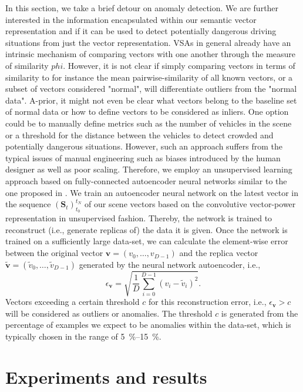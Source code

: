 In this section, we take a brief detour on anomaly detection.
We are further interested in the information encapsulated within our semantic vector representation and if it can be used to detect potentially dangerous driving situations from just the vector representation.
\acp{VSA} in general already have an intrinsic mechanism of comparing vectors with one another through the measure of similarity $phi$.
However, it is not clear if simply comparing vectors in terms of similarity to for instance the mean pairwise-similarity of all known vectors, or a subset of vectors considered "normal", will differentiate outliers from the "normal data".
A-prior, it might not even be clear what vectors belong to the baseline set of normal data or how to define vectors to be considered as inliers.
One option could be to manually define metrics such as the number of vehicles in the scene or a threshold for the distance between the vehicles to detect crowded and potentially dangerous situations.
However, such an approach suffers from the typical issues of manual engineering such as biases introduced by the human designer as well as poor scaling.
Therefore, we employ an unsupervised learning approach based on fully-connected autoencoder neural networks similar to the one proposed in \cite{Chen2017}.
We train an autoencoder neural network on the latest vector in the sequence $(\mathbf{S}_{t})_{t_0}^{t_N}$ of our scene vectors based on the convolutive vector-power representation in unsupervised fashion.
Thereby, the network is trained to reconstruct (i.e., generate replicas of) the data it is given.
Once the network is trained on a sufficiently large data-set, we can calculate the element-wise error between the original vector $ \mathbf{v} = \left(v_{0}, \ldots, v_{D-1}\right)$ and the replica vector $ \tilde{\mathbf{v}} = \left(\tilde{v}_{0}, \ldots, \tilde{v}_{D-1}\right)$ generated by the neural network autoencoder, i.e.,
\begin{equation}
\label{eq:anom_error}
\epsilon_{ \mathbf{v}} = \sqrt{ \frac{1}{D} \sum\limits_{i=0}^{D-1} \left(v_{i} - \tilde{v}_{i}\right)^{2}}.
\end{equation}
Vectors exceeding a certain threshold $c$ for this reconstruction error, i.e., $\epsilon_{ \mathbf{v}} > c$ will be considered as outliers or anomalies.
The threshold $c$ is generated from the percentage of examples we expect to be anomalies within the data-set, which is typically chosen in the range of \SIrange{5}{15}{\percent}.

\section{Experiments and results}
\label{sec:experiments}

